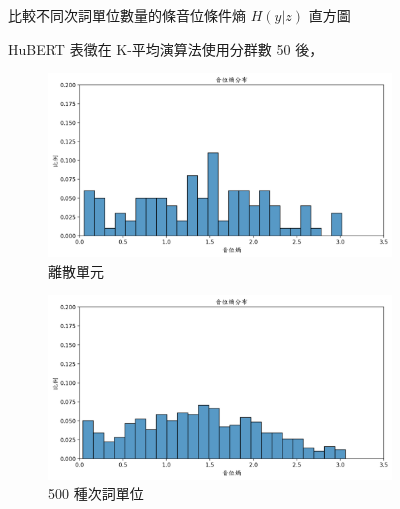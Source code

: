 {{{{\begin{figure}
             \caption{HuBERT 表徵在 K-平均演算法使用分群數 50 後，}
             比較不同次詞單位數量的條音位條件熵 $H(y|z)$ 直方圖
             \label{fig:hub-u050-hist-comparisons}
        \end{figure}
    }
    {
        \newcommand{\tempwidth}[0]{0.7\linewidth}
        \begin{figure}
             \centering
             \begin{subfigure}{\textwidth}
                 \centering
                 \includegraphics[width=\tempwidth]{feasiblefigs/ch4figs/hub-u100-ap0000-phnent-hist.png}
                 \caption{離散單元}
                 \label{fig:hub-u100-ap0000-phnent-hist}
             \end{subfigure}
             \vfill
             \begin{subfigure}{\textwidth}
                 \centering
                 \includegraphics[width=\tempwidth]{feasiblefigs/ch4figs/hub-u100-ap0500-phnent-hist.png}
                 \caption{500 種次詞單位}
                 \label{fig:hub-u100-ap0500-phnent-hist}
             \end{subfigure}
             \vfill
             \begin{subfigure}{\textwidth}

\end{subfigure}
\end{figure}}}}}
